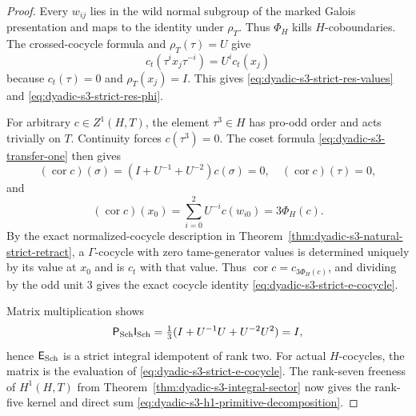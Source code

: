 \documentclass[11pt]{article}
\theoremstyle{definition}
\begin{document}
\begin{proof}
Every $w_{ij}$ lies in
the wild normal subgroup
of the marked Galois
presentation and maps
to the identity under $\rho_T$.
Thus $\Phi_H$ kills
$H$-coboundaries.
The crossed-cocycle formula
and $\rho_T(\tau)=U$ give
\[
c_t(\tau^i x_j\tau^{-i})
=U^i c_t(x_j)
\]
because $c_t(\tau)=0$ and
$\rho_T(x_j)=I$.
This gives
\eqref{eq:dyadic-s3-strict-res-values}
and
\eqref{eq:dyadic-s3-strict-res-phi}.

For arbitrary $c\in Z^1(H,T)$,
the element $\tau^3\in H$
has pro-odd order and
acts trivially on $T$.
Continuity forces
$c(\tau^3)=0$.
The coset formula
\eqref{eq:dyadic-s3-transfer-one}
then gives
\[
(\operatorname{cor}c)(\sigma)
=(I+U^{-1}+U^{-2})c(\sigma)=0,
\quad
(\operatorname{cor}c)(\tau)=0,
\]
and
\[
(\operatorname{cor}c)(x_0)
=\sum_{i=0}^{2}U^{-i}c(w_{i0})
=3\Phi_H(c).
\]
By the exact normalized-cocycle
description in
Theorem~\ref{thm:dyadic-s3-natural-strict-retract},
a $\Gamma$-cocycle with
zero tame-generator values
is determined uniquely by
its value at $x_0$ and
is $c_t$ with that value.
Thus $\operatorname{cor}c
=c_{3\Phi_H(c)}$,
and dividing by the odd
unit $3$ gives the exact
cocycle identity
\eqref{eq:dyadic-s3-strict-e-cocycle}.

Matrix multiplication shows
\[
\mathsf P_{\rm Sch}
\mathsf I_{\rm Sch}
=\tfrac13(I+U^{-1}U+U^{-2}U^2)
=I,
\]
hence $\mathsf E_{\rm Sch}$
is a strict integral
idempotent of rank two.
For actual $H$-cocycles,
the matrix is the evaluation
of \eqref{eq:dyadic-s3-strict-e-cocycle}.
The rank-seven freeness of
$H^1(H,T)$ from
Theorem~\ref{thm:dyadic-s3-integral-sector}
now gives the rank-five kernel
and direct sum
\eqref{eq:dyadic-s3-h1-primitive-decomposition}.
\end{proof}
\end{document}
